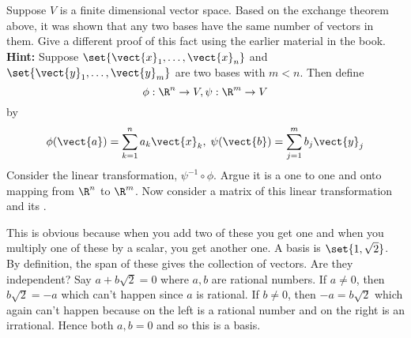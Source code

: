 \begin{ex}
  Suppose $V$ is a finite dimensional vector space. Based on the
  exchange theorem above, it was shown that any two bases have the same number
  of vectors in them. Give a different proof of this fact using the earlier
  material in the book. \textbf{Hint: }Suppose $\set{\vect{x}_1
    ,\ldots,\vect{x}_{n}} $ and $\set{\vect{y}_1,\ldots,\vect{y}
    _{m}} $ are two bases with $m<n$. Then define
  \begin{equation*}
    \phi :\R^{n}\to V,\psi :\R^{m}\to V
  \end{equation*}
  by
  \begin{equation*}
    \phi (\vect{a}) = \sum_{k=1}^{n}a_{k}\vect{x}
    _{k},\;\psi (\vect{b}) = \sum_{j=1}^{m}b_{j}\vect{y}_{j}
  \end{equation*}
  Consider the linear transformation, $\psi ^{-1}\circ \phi$. Argue it is a
  one to one and onto mapping from $\R^{n}$ to $\R^{m}$. Now
  consider a matrix of this linear transformation and its {\rref}.
  \begin{sol}
    This is obvious because
    when you add two of these you get one and when you multiply one of these by
    a scalar, you get another one. A basis is $\set{1,\sqrt{2}}$. By
    definition, the span of these gives the collection of vectors. Are they
    independent? Say $a+b\sqrt{2}=0$ where $a,b$ are rational numbers. If $a\neq
    0$, then $b\sqrt{2}=-a$ which can't happen since $a$ is rational. If $b\neq
    0$, then $-a=b\sqrt{2}$ which again can't happen because on the left is a
    rational number and on the right is an irrational. Hence both $a,b=0$ and so
    this is a basis.
  \end{sol}
\end{ex}

